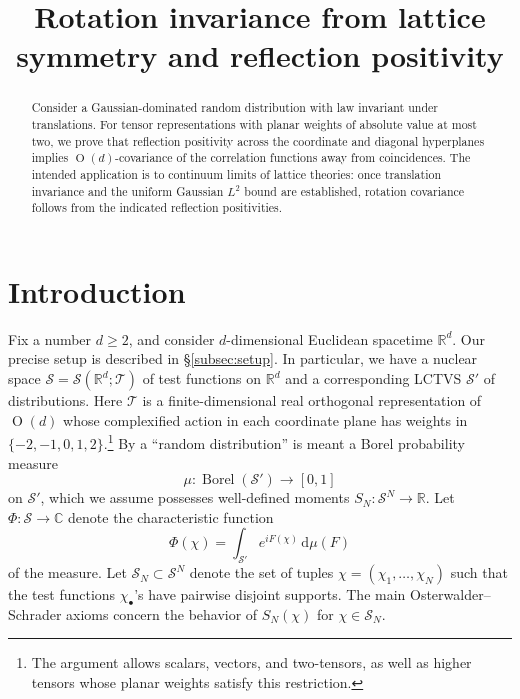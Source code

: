 \documentclass[11pt, letterpaper, reqno]{amsart}
\title[Rotation invariance from lattice symmetry]{Rotation invariance from lattice symmetry and reflection positivity}
\date{}
\theoremstyle{definition}
\theoremstyle{remark}
\newcommand{\bbC}{\mathbb{C}}
\newcommand{\bbR}{\mathbb{R}}
\newcommand{\calS}{\mathcal{S}}
\newcommand{\calT}{\mathcal{T}}
\newcommand{\dd}{\,\mathrm{d}}
\begin{document}
	
\begin{abstract}
    Consider a Gaussian-dominated random distribution with law invariant under translations. For tensor representations with planar weights of absolute value at most two, we prove that reflection positivity across the coordinate and diagonal hyperplanes implies $\operatorname{O}(d)$-covariance of the correlation functions away from coincidences. The intended application is to continuum limits of lattice theories: once translation invariance and the uniform Gaussian $L^2$ bound are established, rotation covariance follows from the indicated reflection positivities. 
\end{abstract}	

\maketitle

\section{Introduction}

Fix a number $d\geq 2$, and consider $d$-dimensional Euclidean spacetime $\bbR^d$. 
Our precise setup is described in \S\ref{subsec:setup}. In particular, we have a nuclear space $\calS=\calS(\bbR^d;\calT)$ of test functions on $\bbR^d$ and a corresponding LCTVS $\calS'$ of distributions. Here $\calT$ is a finite-dimensional real orthogonal representation of $\operatorname{O}(d)$ whose complexified action in each coordinate plane has weights in $\{-2,-1,0,1,2\}$.\footnote{The argument allows scalars, vectors, and two-tensors, as well as higher tensors whose planar weights satisfy this restriction.} By a ``random distribution'' is meant a Borel probability measure 
\begin{equation} 
    \mu:\operatorname{Borel}(\calS')\to [0,1]
\end{equation} 
on $\calS'$, which we assume possesses well-defined moments $S_N: \calS^N\to \bbR$. Let $\Phi:\calS\to \bbC$ denote the characteristic function
\begin{equation}
    \Phi(\chi) = \int_{\calS'} e^{iF(\chi)} \dd \mu(F) 
\end{equation}
of the measure. 
Let $\calS_N \subset \calS^N$ denote the set of tuples $\chi=(\chi_1,\dots,\chi_N)$ such that the test functions $\chi_\bullet$'s have pairwise disjoint supports. The main Osterwalder--Schrader axioms \cite{OS} concern the behavior of $S_N(\chi)$ for $\chi\in \calS_N$. 
\end{document}
